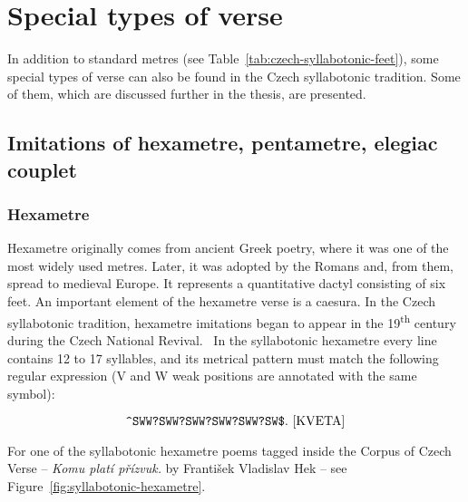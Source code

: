 \section{Special types of verse}
In addition to standard metres (see Table~\ref{tab:czech-syllabotonic-feet}), some special types of verse can also be found in the Czech syllabotonic tradition. Some of them, which are discussed further in the thesis, are presented.

\subsection{Imitations of hexametre, pentametre, elegiac couplet}
\subsubsection{Hexametre}
Hexametre originally comes from ancient Greek poetry, where it was one of the most widely used metres. Later, it was adopted by the Romans and, from them, spread to medieval Europe. It represents a quantitative dactyl consisting of six feet. An important element of the hexametre verse is a caesura. In the Czech syllabotonic tradition, hexametre imitations began to appear in the 19\textsuperscript{th} century during the Czech National Revival.~\cite{UvodTeorieVerse} In the syllabotonic hexametre every line contains 12 to 17 syllables, and its metrical pattern must match the following regular expression (V and W weak positions are annotated with the same symbol):

\begin{equation}\label{eq:hexametre-regex}
        \verb|^SWW?SWW?SWW?SWW?SWW?SW$|.\text{ \cite{KVETA}}
\end{equation}

For one of the syllabotonic hexametre poems tagged inside the Corpus of Czech Verse -- \emph{Komu platí přízvuk.} by František Vladislav Hek -- see Figure~\ref{fig:syllabotonic-hexametre}.~\cite{GitCorpusCzechVerse}

